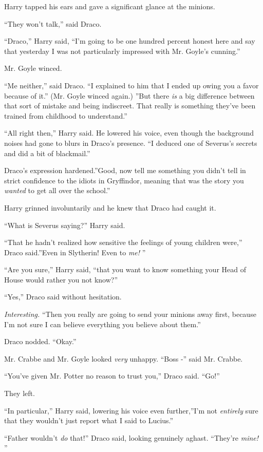 Harry tapped his ears and gave a significant glance at the minions.

``They won't talk,'' said Draco.

``Draco,'' Harry said, ``I'm going to be one hundred percent honest here
and say that yesterday I was not particularly impressed with Mr. Goyle's
cunning.''

Mr. Goyle winced.

``Me neither,'' said Draco. ``I explained to him that I ended up owing
you a favor because of it.'' (Mr. Goyle winced again.) ''But there
\emph{is} a big difference between that sort of mistake and being
indiscreet. That really is something they've been trained from childhood
to understand.''

``All right then,'' Harry said. He lowered his voice, even though the
background noises had gone to blurs in Draco's presence. ``I deduced one
of Severus's secrets and did a bit of blackmail.''

Draco's expression hardened.''Good, now tell me something you didn't
tell in strict confidence to the idiots in Gryffindor, meaning that was
the story you \emph{wanted} to get all over the school.''

Harry grinned involuntarily and he knew that Draco had caught it.

``What is Severus saying?'' Harry said.

``That he hadn't realized how sensitive the feelings of young children
were,'' Draco said.''Even in Slytherin! Even to \emph{me!} ''

``Are you sure,'' Harry said, ``that you want to know something your
Head of House would rather you not know?''

``Yes,'' Draco said without hesitation.

\emph{Interesting.} ``Then you really are going to send your minions
away first, because I'm not sure I can believe everything you believe
about them.''

Draco nodded. ``Okay.''

Mr. Crabbe and Mr. Goyle looked \emph{very} unhappy. ``Boss -'' said Mr.
Crabbe.

``You've given Mr. Potter no reason to trust you,'' Draco said. ``Go!''

They left.

``In particular,'' Harry said, lowering his voice even further,''I'm not
\emph{entirely} sure that they wouldn't just report what I said to
Lucius.''

``Father wouldn't \emph{do} that!'' Draco said, looking genuinely aghast.
``They're \emph{mine!} ''

